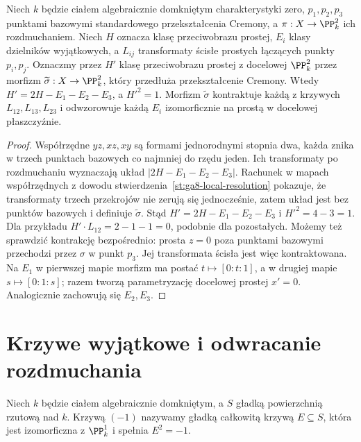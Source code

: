 \begin{stwierdzenie}
\label{st:ga8-cremona-linear}
Niech $k$ będzie ciałem algebraicznie domkniętym
charakterystyki zero, $p_1,p_2,p_3$ punktami bazowymi
standardowego przekształcenia Cremony, a
$\pi:X\to\PP^2_k$ ich rozdmuchaniem. Niech $H$ oznacza
klasę przeciwobrazu prostej, $E_i$ klasy dzielników
wyjątkowych, a $L_{ij}$ transformaty ścisłe prostych
łączących punkty $p_i,p_j$. Oznaczmy przez $H'$ klasę
przeciwobrazu prostej z docelowej $\PP^2_k$ przez
morfizm $\widetilde\sigma:X\to\PP^2_k$, który przedłuża
przekształcenie Cremony. Wtedy
$H'=2H-E_1-E_2-E_3$, a $H'^2=1$.
Morfizm $\widetilde\sigma$ kontraktuje każdą z krzywych
$L_{12},L_{13},L_{23}$ i odwzorowuje każdą $E_i$
izomorficznie na prostą w docelowej płaszczyźnie.
\end{stwierdzenie}
\begin{proof}
Współrzędne $yz,xz,xy$ są formami jednorodnymi
stopnia dwa, każda znika w trzech punktach bazowych
co najmniej do rzędu jeden. Ich transformaty po
rozdmuchaniu wyznaczają układ $|2H-E_1-E_2-E_3|$.
Rachunek w mapach współrzędnych z dowodu
stwierdzenia~\ref{st:ga8-local-resolution} pokazuje,
że transformaty trzech przekrojów nie zerują się
jednocześnie, zatem układ jest bez punktów bazowych
i definiuje $\widetilde\sigma$.
Stąd $H'=2H-E_1-E_2-E_3$ i $H'^2=4-3=1$.
Dla przykładu $H'\cdot L_{12}=2-1-1=0$,
podobnie dla pozostałych. Możemy też sprawdzić
kontrakcję bezpośrednio: prosta $z=0$ poza punktami
bazowymi przechodzi przez $\sigma$ w punkt $p_3$.
Jej transformata ścisła jest więc kontraktowana.
Na $E_1$ w pierwszej mapie morfizm ma postać
$t\mapsto[0:t:1]$, a w drugiej mapie $s\mapsto[0:1:s]$;
razem tworzą parametryzację docelowej prostej $x'=0$.
Analogicznie zachowują się $E_2,E_3$.
\end{proof}

\section{Krzywe wyjątkowe i odwracanie rozdmuchania}
\label{sec:ga8-contraction}

\begin{definicja}[Krzywa $(-1)$]
\label{def:ga8-minus-one}
Niech $k$ będzie ciałem algebraicznie domkniętym,
a $S$ gładką powierzchnią rzutową nad $k$.
Krzywą $(-1)$ nazywamy gładką całkowitą krzywą
$E\subseteq S$, która jest izomorficzna z $\PP^1_k$
i spełnia $E^2=-1$.
\end{definicja}

